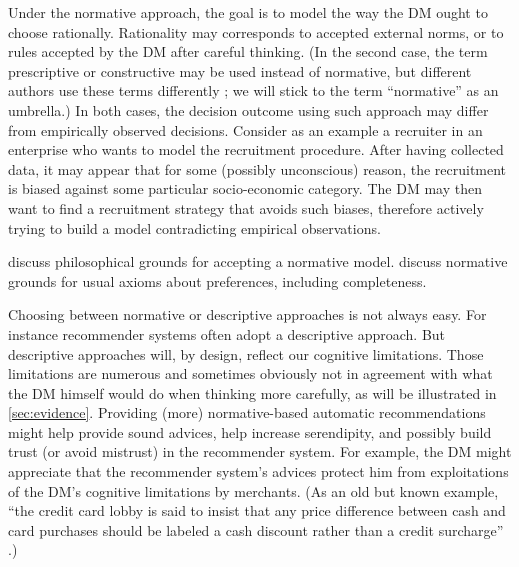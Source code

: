 \documentclass[version=last, pagesize, twocolumn, twoside=off, bibliography=totoc, 12pt, a4paper, english]{scrartcl}
\begin{document}
Under the normative approach, the goal is to model the way the \ac{DM} ought to choose rationally. Rationality may corresponds to accepted external norms, or to rules accepted by the \ac{DM} after careful thinking. (In the second case, the term prescriptive or constructive may be used instead of normative, but different authors use these terms differently \citep{roy_decision_1993, tsoukias_concept_2007}; we will stick to the term “normative” as an umbrella.) In both cases, the decision outcome using such approach may differ from empirically observed decisions. Consider as an example a recruiter in an enterprise who wants to model the recruitment procedure. After having collected data, it may appear that for some (possibly unconscious) reason, the recruitment is biased against some particular socio-economic category. The \ac{DM} may then want to find a recruitment strategy that avoids such biases, therefore actively trying to build a model contradicting empirical observations. 
	
\citet{mcclennen_rationality_1990, guala_logic_2000} discuss philosophical grounds for accepting a normative model. \citet{anand_are_1987, mandler_difficult_2001} discuss normative grounds for usual axioms about preferences, including completeness.

Choosing between normative or descriptive approaches is not always easy. For instance recommender systems often adopt a descriptive approach. 
But descriptive approaches will, by design, reflect our cognitive limitations. Those limitations are numerous and sometimes obviously not in agreement with what the \ac{DM} himself would do when thinking more carefully, as will be illustrated in \cref{sec:evidence}. 
Providing (more) normative-based automatic recommendations might help provide sound advices, help increase serendipity, and possibly build trust (or avoid mistrust) in the recommender system. For example, the \ac{DM} might appreciate that the recommender system’s advices protect him from exploitations of the \ac{DM}’s cognitive limitations by merchants. (As an old but known example, “the credit card lobby is said to insist that any price difference between cash and card purchases should be labeled a cash discount rather than a credit surcharge” \citep{tversky_rational_1986}.) 
	
\end{document}
